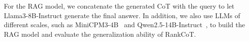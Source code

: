 For the RAG model, we concatenate the generated CoT with the query to let Llama3-8B-Instruct generate the final answer. In addition, we also use LLMs of different scales, such as MiniCPM3-4B~\cite{hu2024minicpm} and Qwen2.5-14B-Instruct~\cite{yang2024qwen2}, to build the RAG model and evaluate the generalization ability of RankCoT.
